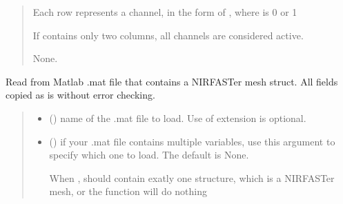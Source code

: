 \documentclass[letterpaper,10pt,english]{sphinxmanual}
\begin{document}
\begin{fulllineitems}
\begin{fulllineitems}
\begin{quote}
\begin{description}
\begin{itemize}
\sphinxAtStartPar
Each row represents a channel, in the form of , where  is 0 or 1

\sphinxAtStartPar
If  contains only two columns, all channels are considered active.


\end{itemize}

\sphinxAtStartPar
None.

\end{description}\end{quote}

\end{fulllineitems}


\begin{fulllineitems}
\label{\detokenize{_autosummary/nirfasterff.base.fluor_mesh.fluormesh:nirfasterff.base.fluor_mesh.fluormesh.from_mat}}
\pysigstartsignatures
{}
\pysigstopsignatures
\sphinxAtStartPar
Read from Matlab .mat file that contains a NIRFASTer mesh struct. All fields copied as is without error checking.
\begin{quote}\begin{description}
\begin{itemize}
\item {} 
\sphinxAtStartPar
{} () \textendash{} name of the .mat file to load. Use of extension is optional.

\item {} 
\sphinxAtStartPar
{} (\sphinxstyleliteralemphasis{\sphinxupquote{, }}) \textendash{} 
\sphinxAtStartPar
if your .mat file contains multiple variables, use this argument to specify which one to load. The default is None.

\sphinxAtStartPar
When ,  should contain exatly one structure, which is a NIRFASTer mesh, or the function will do nothing



\end{itemize}
\end{description}
\end{quote}
\end{fulllineitems}
\end{fulllineitems}
\end{document}
